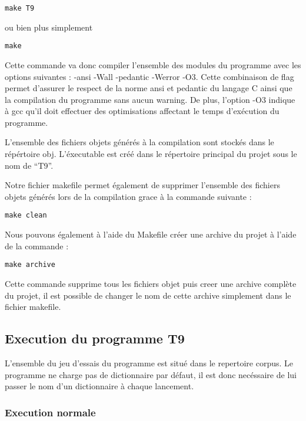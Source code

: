\documentclass[15pt, a4paper]{article}
\begin{document}
\begin{verbatim}
make T9
\end{verbatim}

ou bien plus simplement

\begin{verbatim}
make
\end{verbatim}

Cette commande va donc compiler l'ensemble des modules du programme avec les options suivantes :  
-ansi -Wall -pedantic -Werror -O3. Cette combinaison de flag permet d'assurer le respect de la norme ansi et
pedantic du langage C ainsi que la compilation du programme sans aucun warning. De plus, l'option -O3 indique
à gcc qu'il doit effectuer des optimisations affectant le temps d'exécution du programme.

L'ensemble des fichiers objets générés à la compilation sont stockés dans le répértoire obj. L'éxecutable est créé 
dans le répertoire principal du projet sous le nom de ``T9''.

\bigskip

Notre fichier makefile permet également de supprimer l'ensemble des fichiers objets générés lors de la
compilation grace à la commande suivante :

\begin{verbatim}
make clean
\end{verbatim}

\noindent Nous pouvons également à l'aide du Makefile créer une archive du projet à l'aide de la commande :

\begin{verbatim}
make archive
\end{verbatim}

Cette commande supprime tous les fichiers objet puis creer une archive complète du projet, il est possible
de changer le nom de cette archive simplement dans le fichier makefile.

\subsection{Execution du programme T9}

L'ensemble du jeu d'essais du programme est situé dans le repertoire corpus. Le programme ne charge pas 
de dictionnaire par défaut, il est donc necéssaire de lui passer le nom d'un dictionnaire à chaque lancement.

\subsubsection{Execution normale}
\end{document}
